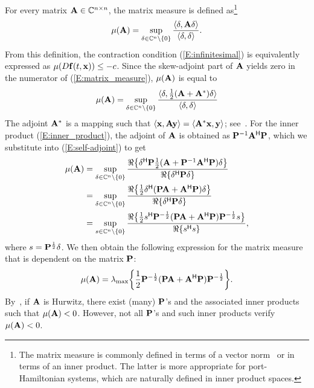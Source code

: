 For every matrix $\mathbf{A} \in \mathbb{C}^{n\times n}$, the matrix measure is defined as\footnote{The matrix measure is commonly defined in terms of a vector norm~\cite{soderlind2006logarithmic} or in terms of an inner product. The latter is more appropriate for port-Hamiltonian systems, which are naturally defined in inner product spaces.}
\begin{equation} \label{E:matrix_measure}
    \mu(\mathbf{A}) = \sup_{\delta \in \mathbb{C}^n \backslash \{0\}} \frac{\langle \delta, \mathbf{A} \delta \rangle}{\langle \delta, \delta \rangle}.
\end{equation}
From this definition, the contraction condition (\ref{E:infinitesimal}) is equivalently expressed as $\mu(D \mathbf{f}(t, \mathbf{x})) \leq -c$. 
Since the skew-adjoint part of $\mathbf{A}$ yields zero in the numerator of (\ref{E:matrix_measure}), $\mu(\mathbf{A})$ is equal to
\begin{equation} \label{E:self-adjoint}
    \mu(\mathbf{A}) = \sup_{\delta \in \mathbb{C}^n \backslash \{0\}} \frac{\langle \delta, \frac{1}{2}(\mathbf{A} + \mathbf{A}^*) \delta \rangle}{\langle \delta, \delta \rangle}
\end{equation}
The adjoint $\mathbf{A}^*$ is a mapping such that $\langle \mathbf{x}, \mathbf{A} \mathbf{y} \rangle = \langle \mathbf{A}^* \mathbf{x}, \mathbf{y} \rangle$; see~\cite[Sec.~4.4]{bressan2012lecture}.
For the inner product (\ref{E:inner_product}), the adjoint of $\mathbf{A}$ is obtained as $\mathbf{P}^{-1} \mathbf{A}^{\mathsf{H}} \mathbf{P}$, which we substitute into (\ref{E:self-adjoint}) to get
\begin{align*}
    \mu(\mathbf{A}) &= \sup_{\delta \in \mathbb{C}^n \backslash \{0\}} \frac{\Re\big\{ \delta^{\mathsf{H}} \mathbf{P} \frac{1}{2} (\mathbf{A} + \mathbf{P}^{-1} \mathbf{A}^{\mathsf{H}} \mathbf{P}) \delta \big\}}{\Re\{ \delta^{\mathsf{H}} \mathbf{P} \delta \}} \\
    &= \sup_{\delta \in \mathbb{C}^n \backslash \{0\}} \frac{\Re\big\{\frac{1}{2} \delta^{\mathsf{H}} (\mathbf{P} \mathbf{A} + \mathbf{A}^{\mathsf{H}} \mathbf{P}) \delta \big\}}{\Re\{ \delta^{\mathsf{H}} \mathbf{P} \delta \}} \\
    &= \sup_{s \in \mathbb{C}^n \backslash \{0\}} \frac{\Re\big\{\frac{1}{2} s^{\mathsf{H}} \mathbf{P}^{-\frac{1}{2}} (\mathbf{P} \mathbf{A} + \mathbf{A}^{\mathsf{H}} \mathbf{P})\mathbf{P}^{-\frac{1}{2}} s \big\}}{\Re\{ s^{\mathsf{H}} s \}},
\end{align*}
where $s = \mathbf{P}^{\frac{1}{2}} \delta$.
We then obtain the following expression for the matrix measure that is dependent on the matrix $\mathbf{P}$:
\begin{equation*}
    \mu(\mathbf{A}) = \lambda_{\max} \bigg\{ \frac{1}{2} \mathbf{P}^{-\frac{1}{2}} (\mathbf{P} \mathbf{A} + \mathbf{A}^{\mathsf{H}} \mathbf{P}) \mathbf{P}^{-\frac{1}{2}} \bigg\}.
\end{equation*}
By~\cite[Thm.~4.6]{Khalil:1173048}, if $\mathbf{A}$ is Hurwitz, there exist (many) $\mathbf{P}$'s and the associated inner products such that $\mu(\mathbf{A}) < 0$. However, not all $\mathbf{P}$'s and such inner products verify $\mu(\mathbf{A}) < 0$. 

